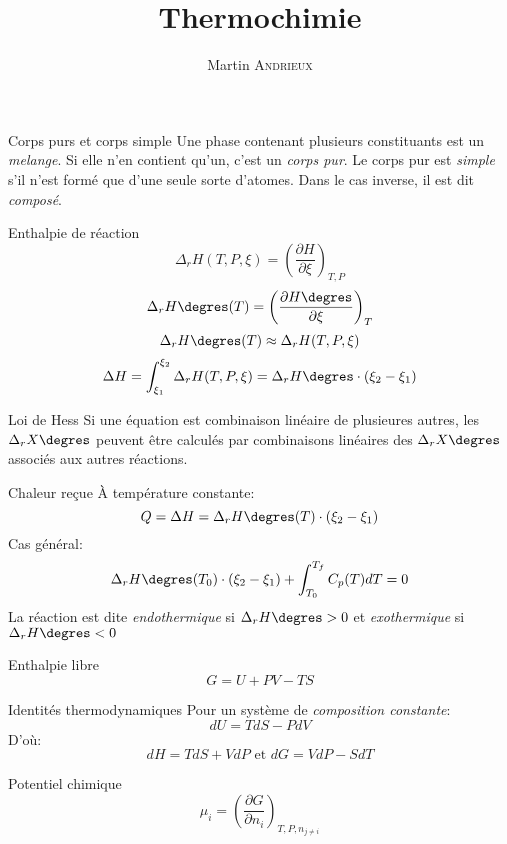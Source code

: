 \documentclass[french, a4paper, 11pt, twocolumn]{article}
\title{Thermochimie}
\author{Martin \textsc{Andrieux}}
\date{}
\newcommand{\po}{\left(}         %
\newcommand{\pf}{\right)}        %
\newcommand{\pof}[1]{\po #1 \pf} %
\newcommand{\drz}[1]{\Delta_r#1\degres}
\begin{document}
\maketitle

\begin{cadre}{Corps purs et corps simple}
  Une phase contenant plusieurs constituants est un \emph{melange}. Si elle n'en contient qu'un, c'est un \emph{corps pur}.
  Le corps pur est \emph{simple} s'il n'est formé que d'une seule sorte d'atomes. Dans le cas inverse, il est dit \emph{composé}.
\end{cadre}

\begin{cadre}{Enthalpie de réaction}
  \[\Delta_{r}H(T, P, \xi) = \pof{\dfrac{\partial H}{\partial \xi}}_{T,P}\]
  \[\drz{H}(T) = \pof{\dfrac{\partial H\degres}{\partial \xi}}_{T}\]
  \[\drz{H}(T) \approx \Delta_{r}H(T,P,\xi)\]
  \[\Delta H = \int_{\xi_{1}}^{\xi_{2}}\Delta_{r}H(T,P,\xi)=\drz{H}\cdot\pof{\xi_{2}-\xi_{1}} \]
\end{cadre}

\begin{cadre}{Loi de Hess}
  Si une équation est combinaison linéaire de plusieures autres, les $\drz{X}$ peuvent être calculés par combinaisons linéaires des $\drz{X}$ associés aux autres réactions.
\end{cadre}

\begin{cadre}{Chaleur reçue}
  À température constante:
  \[Q = \Delta H = \drz{H}(T)\cdot\pof{\xi_{2}-\xi_{1}}\]
  Cas général:
  \[\drz{H}(T_{0})\cdot\pof{\xi_{2}-\xi_{1}}+\int_{T_{0}}^{T_{f}}C_{p}(T)dT = 0 \]
  La réaction est dite \emph{endothermique} si $\drz{H} > 0$ et \emph{exothermique} si $\drz{H} < 0$
\end{cadre}

\begin{cadre}{Enthalpie libre}
  \[G = U + PV - TS\]
\end{cadre}

\begin{cadre}{Identités thermodynamiques}
  Pour un système de \emph{composition constante}:
  \[dU = TdS - PdV\]
  D'où:
  \[dH = TdS + VdP\text{ et }dG = VdP - SdT\]
\end{cadre}

\begin{cadre}{Potentiel chimique}
  \[\mu_{i} = \pof{\dfrac{\partial G}{\partial n_{i}}}_{T,P,n_{j\neq i}}\]
\end{cadre}
\end{document}
